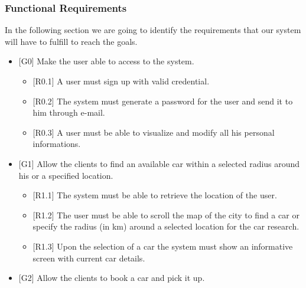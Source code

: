 \documentclass[]{article}
\providecommand{\tightlist}{%
  \setlength{\itemsep}{0pt}\setlength{\parskip}{0pt}}
\begin{document}
\subsubsection{Functional Requirements}\label{functional-requirements}

In the following section we are going to identify the requirements that
our system will have to fulfill to reach the goals.

\begin{itemize}
\item
  {[}G0{]} Make the user able to access to the system.

  \begin{itemize}
  \tightlist
  \item
    {[}R0.1{]} A user must sign up with valid credential.
  \item
    {[}R0.2{]} The system must generate a password for the user and send
    it to him through e-mail.
  \item
    {[}R0.3{]} A user must be able to visualize and modify all his
    personal informations.
  \end{itemize}
\item
  {[}G1{]} Allow the clients to find an available car within a selected
  radius around his or a specified location.

  \begin{itemize}
  \tightlist
  \item
    {[}R1.1{]} The system must be able to retrieve the location of the
    user.
  \item
    {[}R1.2{]} The user must be able to scroll the map of the city to
    find a car or specify the radius (in km) around a selected location
    for the car research.
  \item
    {[}R1.3{]} Upon the selection of a car the system must show an
    informative screen with current car details.
  \end{itemize}
\item
  {[}G2{]} Allow the clients to book a car and pick it up.


\end{itemize}
\end{document}
